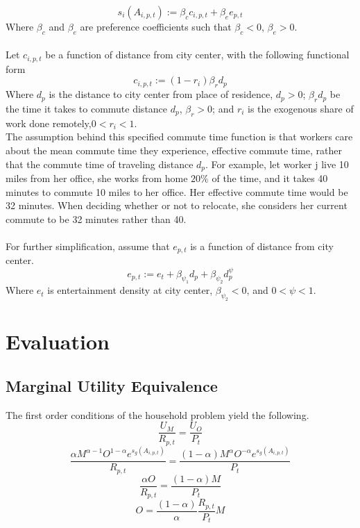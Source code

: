 \documentclass{article}
\begin{document}
\begin{equation}
s_i(A_{i,p,t}) := \beta_c c_{i,p,t} + \beta_e e_{p,t}
\end{equation}
Where $\beta_c$ and $\beta_e$ are preference coefficients such that $\beta_c < 0$, $\beta_e > 0$.\\ \\
Let $c_{i,p,t}$ be a function of distance from city center, with the following functional form
\begin{equation}
c_{i,p,t} := (1-r_i)\beta_r d_p
\end{equation}
Where $d_p$ is the distance to city center from place of residence, $d_p > 0$; $\beta_r d_p$ be the time it takes to commute distance $d_p$, $\beta_r > 0$; and $r_i$ is the exogenous share of work done remotely,$0 < r_i < 1$.\\
The assumption behind this specified commute time function is that workers care about the mean commute time they experience, effective commute time, rather that the commute time of traveling distance $d_p$. For example, let worker j live 10 miles from her office, she works from home $20\%$ of the time, and it takes 40 minutes to commute 10 miles to her office. Her effective commute time would be 32 minutes. When deciding whether or not to relocate, she considers her current commute to be 32 minutes rather than 40.\\ \\
For further simplification, assume that $e_{p,t}$ is a function of distance from city center.\\
\begin{equation}
e_{p,t} := e_{t} + \beta_{\psi_1} d_p + \beta_{\psi_2} d_p^\psi
\end{equation}
Where $e_{t}$ is entertainment density at city center, $\beta_{\psi_2} < 0$, and $0 < \psi < 1$.

\section{Evaluation}
\subsection{Marginal Utility Equivalence}
The first order conditions of the household problem yield the following.
$$\frac{U_M}{R_{p,t}} = \frac{U_O}{P_t}$$
$$\frac{\alpha M^{\alpha - 1} O^{1-\alpha}e^{s_g(A_{i,p,t})}}{R_{p,t}} = \frac{ (1-\alpha)M^{\alpha}O^{-\alpha}e^{s_g(A_{i,p,t})}}{P_t}$$
$$\frac{\alpha O}{R_{p,t}} = \frac{(1-\alpha)M}{P_t}$$
$$O = \frac{(1 - \alpha)}{\alpha}\frac{R_{p,t}}{P_t}M$$
\end{document}
